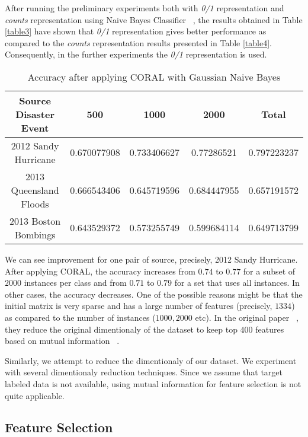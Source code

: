After running the preliminary experiments both with \textit{0/1} representation and \textit{counts} representation using Naive Bayes Classifier ~\citep{tom}, the results obtained in Table \ref{table3} have shown that \textit{0/1} representation gives better performance as compared to the \textit{counts} representation results presented in Table \ref{table4}. Consequently, in the further experiments the \textit{0/1} representation is used.


\begin{table}[ht]
    \begin{center}
    \caption{Accuracy after applying CORAL with Gaussian Naive Bayes}
    \begin{tabular}[c]{|c|c|c|c|c|}
        \hline
        Source Disaster Event & 500 & 1000 & 2000 & Total \\
        \hline
        2012 Sandy Hurricane & 0.670077908 & 0.733406627 & 0.77286521 & 0.797223237 \\
        2013 Queensland Floods & 0.666543406 & 0.645719596 & 0.684447955 & 0.657191572\\
        2013 Boston Bombings & 0.643529372 & 0.573255749 & 0.599684114 & 0.649713799 \\
        \hline
    \end{tabular}
    \label{tablecoral}
   \end{center}
\end{table}

We can see improvement for one pair of source, precisely, 2012 Sandy Hurricane. After applying CORAL, the accuracy increases from $0.74$ to $0.77$ for a subset of $2000$ instances per class and from $0.71$ to $0.79$ for a set that uses all instances. In other cases, the accuracy decreases. One of the possible reasons might be that the initial matrix is very sparse and has a large number of features (precisely, $1334$) as compared to the number of instances ($1000, 2000$ etc). In the original paper ~\citep{coral}, they reduce the original dimentionaly of the dataset to keep top $400$ features based on mutual information ~\citep{hastie}. 

Similarly, we attempt to reduce the dimentionaly of our dataset. We experiment with several dimentionaly reduction techniques. Since we assume that target labeled data is not available, using mutual information for feature selection is not quite applicable.

\subsection{Feature Selection}
\label{varthressub}

